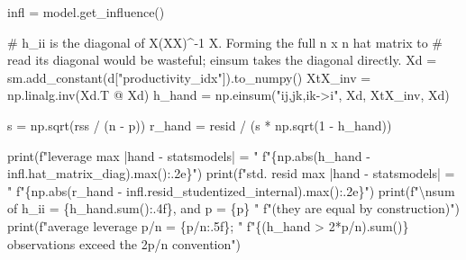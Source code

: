 \documentclass[
  letterpaper,
  10pt,
  twoside,
  openright,
  numbers=noenddot,
  chapterprefix=true]{scrbook}
\newenvironment{Shaded}{}{}
\newcommand{\BuiltInTok}[1]{\textcolor[rgb]{0.84,0.23,0.29}{#1}}
\newcommand{\CharTok}[1]{\textcolor[rgb]{0.01,0.18,0.38}{#1}}
\newcommand{\CommentTok}[1]{\textcolor[rgb]{0.42,0.45,0.49}{#1}}
\newcommand{\DecValTok}[1]{\textcolor[rgb]{0.00,0.36,0.77}{#1}}
\newcommand{\NormalTok}[1]{\textcolor[rgb]{0.14,0.16,0.18}{#1}}
\newcommand{\OperatorTok}[1]{\textcolor[rgb]{0.14,0.16,0.18}{#1}}
\newcommand{\SpecialCharTok}[1]{\textcolor[rgb]{0.00,0.36,0.77}{#1}}
\newcommand{\SpecialStringTok}[1]{\textcolor[rgb]{0.01,0.18,0.38}{#1}}
\newcommand{\StringTok}[1]{\textcolor[rgb]{0.01,0.18,0.38}{#1}}
\begin{document}
\label{check-leverage}
\begin{Shaded}
\begin{Highlighting}[]
\NormalTok{infl }\OperatorTok{=}\NormalTok{ model.get\_influence()}

\CommentTok{\# h\_ii is the diagonal of X(X\textquotesingle{}X)\^{}{-}1 X\textquotesingle{}. Forming the full n x n hat matrix to}
\CommentTok{\# read its diagonal would be wasteful; einsum takes the diagonal directly.}
\NormalTok{Xd }\OperatorTok{=}\NormalTok{ sm.add\_constant(d[}\StringTok{"productivity\_idx"}\NormalTok{]).to\_numpy()}
\NormalTok{XtX\_inv }\OperatorTok{=}\NormalTok{ np.linalg.inv(Xd.T }\OperatorTok{@}\NormalTok{ Xd)}
\NormalTok{h\_hand }\OperatorTok{=}\NormalTok{ np.einsum(}\StringTok{"ij,jk,ik{-}\textgreater{}i"}\NormalTok{, Xd, XtX\_inv, Xd)}

\NormalTok{s }\OperatorTok{=}\NormalTok{ np.sqrt(rss }\OperatorTok{/}\NormalTok{ (n }\OperatorTok{{-}}\NormalTok{ p))}
\NormalTok{r\_hand }\OperatorTok{=}\NormalTok{ resid }\OperatorTok{/}\NormalTok{ (s }\OperatorTok{*}\NormalTok{ np.sqrt(}\DecValTok{1} \OperatorTok{{-}}\NormalTok{ h\_hand))}

\BuiltInTok{print}\NormalTok{(}\SpecialStringTok{f"leverage    max |hand {-} statsmodels| = "}
      \SpecialStringTok{f"}\SpecialCharTok{\{}\NormalTok{np}\SpecialCharTok{.}\BuiltInTok{abs}\NormalTok{(h\_hand }\OperatorTok{{-}}\NormalTok{ infl.hat\_matrix\_diag)}\SpecialCharTok{.}\BuiltInTok{max}\NormalTok{()}\SpecialCharTok{:.2e\}}\SpecialStringTok{"}\NormalTok{)}
\BuiltInTok{print}\NormalTok{(}\SpecialStringTok{f"std. resid  max |hand {-} statsmodels| = "}
      \SpecialStringTok{f"}\SpecialCharTok{\{}\NormalTok{np}\SpecialCharTok{.}\BuiltInTok{abs}\NormalTok{(r\_hand }\OperatorTok{{-}}\NormalTok{ infl.resid\_studentized\_internal)}\SpecialCharTok{.}\BuiltInTok{max}\NormalTok{()}\SpecialCharTok{:.2e\}}\SpecialStringTok{"}\NormalTok{)}
\BuiltInTok{print}\NormalTok{(}\SpecialStringTok{f"}\CharTok{\textbackslash{}n}\SpecialStringTok{sum of h\_ii = }\SpecialCharTok{\{}\NormalTok{h\_hand}\SpecialCharTok{.}\BuiltInTok{sum}\NormalTok{()}\SpecialCharTok{:.4f\}}\SpecialStringTok{, and p = }\SpecialCharTok{\{}\NormalTok{p}\SpecialCharTok{\}}\SpecialStringTok{  "}
      \SpecialStringTok{f"(they are equal by construction)"}\NormalTok{)}
\BuiltInTok{print}\NormalTok{(}\SpecialStringTok{f"average leverage p/n = }\SpecialCharTok{\{}\NormalTok{p}\OperatorTok{/}\NormalTok{n}\SpecialCharTok{:.5f\}}\SpecialStringTok{;  "}
      \SpecialStringTok{f"}\SpecialCharTok{\{}\NormalTok{(h\_hand }\OperatorTok{\textgreater{}} \DecValTok{2}\OperatorTok{*}\NormalTok{p}\OperatorTok{/}\NormalTok{n)}\SpecialCharTok{.}\BuiltInTok{sum}\NormalTok{()}\SpecialCharTok{\}}\SpecialStringTok{ observations exceed the 2p/n convention"}\NormalTok{)}
\end{Highlighting}
\end{Shaded}
\end{document}
